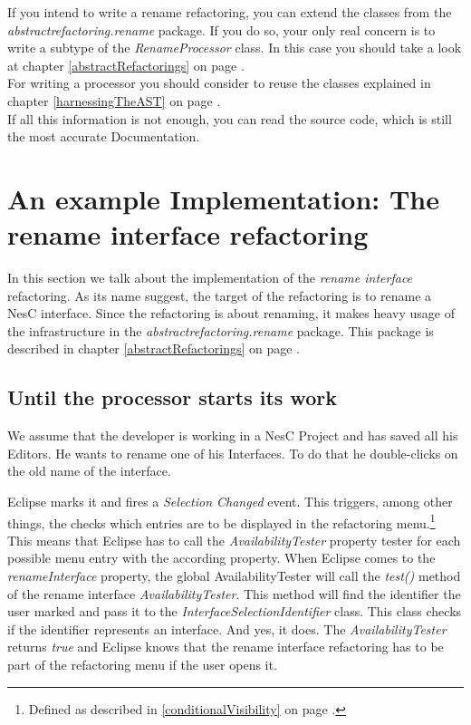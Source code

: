 \documentclass[a4paper,10pt]{report}
\begin{document}
If you intend to write a rename refactoring, you can extend the classes from the {\it abstractrefactoring.rename} package.
If you do so, your only real concern is to write a subtype of the {\it RenameProcessor} class.
In this case you should take a look at chapter \ref{abstractRefactorings} on page \pageref{abstractRefactorings}.\\
For writing a processor you should consider to reuse the classes explained in chapter \ref{harnessingTheAST} on page \pageref{harnessingTheAST}.\\
If all this information is not enough, you can read the source code, which is still the most accurate Documentation.

\chapter{An example Implementation: The rename interface refactoring}
In this section we talk about the implementation of the {\it rename interface} refactoring. As its name suggest, the target of the refactoring is to rename a NesC interface.
Since the refactoring is about renaming, it makes heavy usage of the infrastructure in the {\it abstractrefactoring.rename} package.
This package is described in chapter \ref{abstractRefactorings} on page \pageref{abstractRefactorings}.

\section{Until the processor starts its work}
We assume that the developer is working in a NesC Project and has saved all his Editors. He wants to rename one of his Interfaces. To do that he double-clicks on the old
name of the interface. 

Eclipse marks it and fires a {\it Selection Changed} event. 
This triggers, among other things, the checks which entries are to be displayed in the refactoring menu.\footnote{Defined as described in \ref{conditionalVisibility} on page \pageref{conditionalVisibility}.}
This means that  Eclipse has to call the {\it AvailabilityTester} property tester for each possible menu entry with the according property. When Eclipse comes to the 
{\it  renameInterface} property, the global AvailabilityTester will call the {\it test()} method of the rename interface {\it AvailabilityTester}. This method will find the 
identifier the user marked and pass it to the {\it InterfaceSelectionIdentifier} class. This class checks if the identifier represents an interface. And yes, it does. 
The {\it AvailabilityTester} returns {\it true} and Eclipse knows that the rename interface refactoring has to be part of the refactoring menu if the user opens it.
\end{document}
